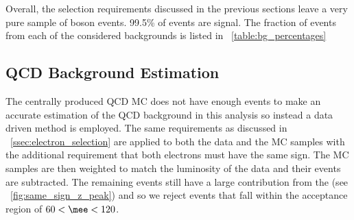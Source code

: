 Overall, the selection requirements discussed in the previous sections leave a
very pure sample of \Z boson events. 99.5\% of events are signal. The fraction
of events from each of the considered backgrounds is listed in
\TAB~\ref{table:bg_percentages}

\subsection{QCD Background Estimation}

The centrally produced QCD MC does not have enough events to make an accurate
estimation of the QCD background in this analysis so instead a data driven
method is employed. The same requirements as discussed in
\SEC~\ref{ssec:electron_selection} are applied to both the data and the MC
samples with the additional requirement that both electrons must have the same
sign. The MC samples are then weighted to match the luminosity of the data and
their events are subtracted. The remaining events still have a large
contribution from the \Z (see \FIG~\ref{fig:same_sign_z_peak}) and so we reject
events that fall within the \mee acceptance region of $60 < \mee < 120$.

